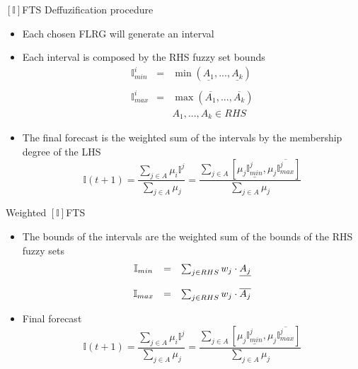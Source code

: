 \documentclass{beamer}
\begin{document}

\begin{frame}{$[\mathbb{I}]$FTS Deffuzification procedure}
\linespread{1.5}
\begin{itemize}
\item Each chosen FLRG will generate an interval 
\item Each interval is composed by the RHS fuzzy set bounds
$$
\begin{array}{lcr}
\mathbb{I}^i_{min} & = & \min( \underline{A_1}, ..., \underline{A_k} ) \\
& & \\
\mathbb{I}^i_{max} & = & \max( \overline{A_1}, ..., \overline{A_k} ) \\ 
& & A_1, ..., A_k \in RHS 
\end{array}
$$
\item The final forecast is the weighted sum of the intervals by the membership degree of the LHS
$$
\mathbb{I}(t+1) = \frac{\sum_{j \in A} \mu_i \mathbb{I}^j}{\sum_{j \in A} \mu_j} = \frac{\sum_{j \in A} [\mu_j\underline{\mathbb{I}^j_{min}} , \mu_j\overline{\mathbb{I}^j_{max}}] }{\sum_{j \in A} \mu_j}
\label{eqn:ifts}
$$
\end{itemize}
\end{frame}

\note[itemize]{
\item 
}



\begin{frame}{Weighted $[\mathbb{I}]$FTS}
\begin{itemize}
    \item The bounds of the intervals are the weighted sum of the bounds of the RHS fuzzy sets
    $$
\begin{array}{ccc}
\mathbb{I}_{min} & = & \sum_{j \in RHS} w_j \cdot \underline{A_j} \\
& & \\
\mathbb{I}_{max} & = & \sum_{j \in RHS} w_j \cdot \overline{A_j}
\end{array}
\label{eqn:weighted_iminimax}
$$
\item Final forecast
$$
\mathbb{I}(t+1) = \frac{\sum_{j \in A} \mu_i \mathbb{I}^j}{\sum_{j \in A} \mu_j} = \frac{\sum_{j \in A} [\mu_j\underline{\mathbb{I}^j_{min}} , \mu_j\overline{\mathbb{I}^j_{max}}] }{\sum_{j \in A} \mu_j}
\label{eqn:ifts}
$$
\end{itemize}
\end{frame}
\end{document}
